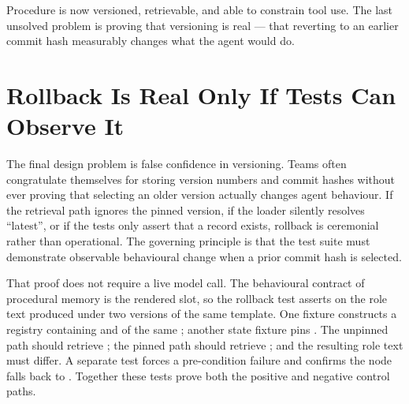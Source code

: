 Procedure is now versioned, retrievable, and able to constrain tool use. The last unsolved problem is proving that versioning is real --- that reverting to an earlier commit hash measurably changes what the agent would do.

\section{Rollback Is Real Only If Tests Can Observe It}
\label{sec:rollback-must-be-tested}

The final design problem is false confidence in versioning. Teams often congratulate themselves for storing version numbers and commit hashes without ever proving that selecting an older version actually changes agent behaviour. If the retrieval path ignores the pinned version, if the loader silently resolves ``latest'', or if the tests only assert that a record exists, rollback is ceremonial rather than operational. The governing principle is that the test suite must demonstrate observable behavioural change when a prior commit hash is selected.

That proof does not require a live model call. The behavioural contract of procedural memory is the rendered  slot, so the rollback test asserts on the role text produced under two versions of the same template. One fixture constructs a registry containing  and  of the same ; another state fixture pins . The unpinned path should retrieve ; the pinned path should retrieve ; and the resulting role text must differ. A separate test forces a pre-condition failure and confirms the node falls back to . Together these tests prove both the positive and negative control paths.

